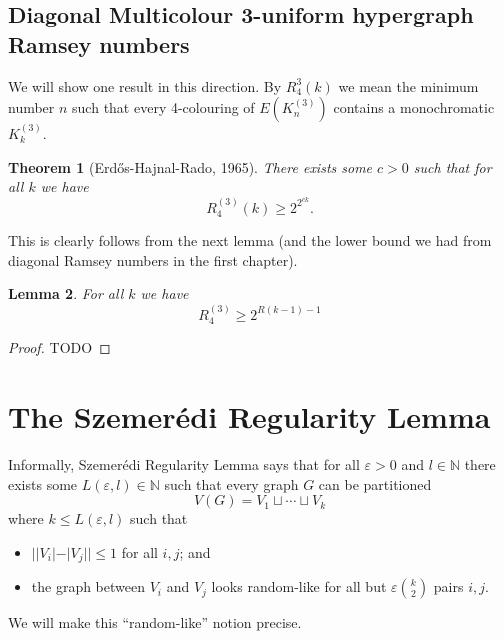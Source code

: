 \documentclass{report}
\theoremstyle{definition}
\theoremstyle{plain}
\newtheorem{thm}{Theorem}
\newtheorem{lem}[thm]{Lemma}
\theoremstyle{definition}
\begin{document}
	\section{Diagonal Multicolour 3-uniform hypergraph Ramsey numbers}
	We will show one result in this direction. By $R^{3}_4(k)$ we mean the minimum number $n$ such that every 4-colouring of $E(K_n^{(3)})$ contains a monochromatic $K_k^{(3)}$.
	\begin{thm}[Erd\H{o}s-Hajnal-Rado, 1965]
		There exists some $c>0$ such that for all $k$ we have
		\[
			R^{(3)}_4(k) \geq 2^{2^{ck}}.
		\]
	\end{thm}
	This is clearly follows from the next lemma (and the lower bound we had from diagonal Ramsey numbers in the first chapter).
	\begin{lem}
		For all $k$ we have
		\[
			R^{(3)}_4 \geq 2^{R(k-1) - 1}
		\]
	\end{lem}
	\begin{proof}
		{\color{red}TODO}
	\end{proof}
	\chapter{The Szemerédi Regularity Lemma}
	Informally, Szemerédi Regularity Lemma says that for all $\varepsilon >0$ and $l\in\mathbb{N}$ there exists some $L(\varepsilon,l) \in\mathbb{N}$ such that every graph $G$ can be partitioned
	\[
		V(G) = V_1 \sqcup \cdots \sqcup V_k
	\]
	where $k\leq L(\varepsilon,l)$ such that
	\begin{itemize}
		\item $||V_i| - |V_j|| \leq 1$ for all $i,j$; and
		\item the graph between $V_i$ and $V_j$ looks random-like for all but $\varepsilon\binom{k}{2}$ pairs $i,j$.
	\end{itemize}
	We will make this ``random-like'' notion precise.
\end{document}
